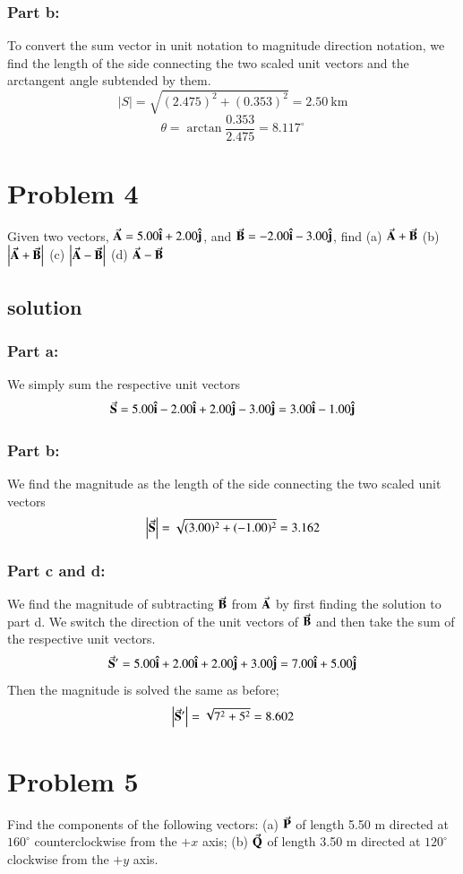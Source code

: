 \documentclass{article}
\begin{document}
\subsubsection*{Part b:}
To convert the sum vector in unit notation to magnitude direction notation, we find the length of the side connecting the two scaled unit vectors and the arctangent angle subtended by them.
\[
	|S| = \sqrt{(2.475)^2 + (0.353)^2} = 2.50\ \text{km}
\]
\[
	\theta = \arctan \frac{0.353}{2.475} = 8.117^\circ
\]

\section*{Problem 4}
Given two vectors, $\va A  = 5.00 \vu i + 2.00 \vu j$, and $\va B = -2.00 \vu i - 3.00 \vu j$, find
(a) $\va A + \va B$
(b) $\left|\va A + \va B\right|$
(c) $\left|\va A - \va B\right|$
(d) $\va A - \va B$

\subsection*{solution}
\subsubsection*{Part a:}
We simply sum the respective unit vectors
\[
	\va S = 5.00 \vu i - 2.00 \vu i + 2.00 \vu j - 3.00 \vu j = 3.00 \vu i - 1.00 \vu j
\]
\subsubsection*{Part b:}
We find the magnitude as the length of the side connecting the two scaled unit vectors
\[
	\left|\va S\right| = \sqrt{(3.00)^2 + (-1.00)^2} = 3.162
\]

\subsubsection*{Part c and d:}
We find the magnitude of subtracting $\va B$ from $\va A$ by first finding the solution to part d. We switch the direction of the unit vectors of $\va B$ and then take the sum of the respective unit vectors.
\[
	\va S^\prime = 5.00 \vu i + 2.00 \vu i + 2.00 \vu j + 3.00 \vu j = 7.00 \vu i + 5.00 \vu j
\]
Then the magnitude is solved the same as before;
\[
	\left|\va S^\prime\right| = \sqrt{7^2 + 5^2} = 8.602
\]

\section*{Problem 5}
Find the components of the following vectors: (a) $\va P$ of length 5.50 m directed at $160^\circ$
counterclockwise from the $+x$ axis; (b) $\va Q$ of length 3.50 m directed at $120^\circ$ clockwise from the
$+y$ axis.
\end{document}
